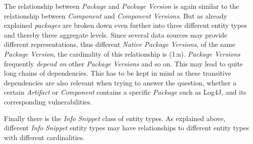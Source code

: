 The relationship between \emph{Package} and \emph{Package Version} is again similar to the relationship between \emph{Component} and \emph{Component Versions}. But as already explained \emph{packages} are broken down even further into three different entity types and thereby three aggregate levels. Since several data sources may provide different representations, thus different \emph{Native Package Versions}, of the same \emph{Package Version}, the cardinality of this relationship is (1:n). \emph{Package Versions} frequently \emph{depend on} other \emph{Package Versions} and so on. This may lead to quite long chains of dependencies. This has to be kept in mind as these transitive dependencies are also relevant when trying to answer the question, whether a certain \emph{Artifact} or \emph{Component} contains a specific \emph{Package} such as Log4J, and its corresponding vulnerabilities.\par
Finally there is the \emph{Info Snippet} class of entity types. As explained above, different \emph{Info Snippet} entity types may have relationships to different entity types with different cardinalities.

